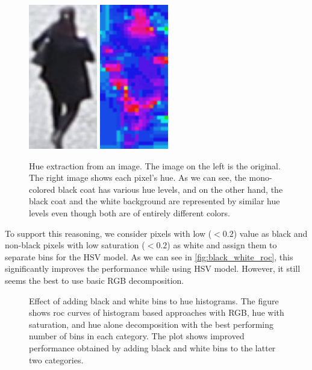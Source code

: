 \begin{figure}
    \centering
    \includegraphics[width=3cm]{img/bad_hue_orig.png}
    \includegraphics[width=3cm]{img/bad_hue_hue.png}
    \caption[Hue extraction from an image]{Hue extraction from an image. The image on the left is the original. The right image shows each pixel's hue. As we can see, the mono-colored black coat has various hue levels, and on the other hand, the black coat and the white background are represented by similar hue levels even though both are of entirely different colors.}
    \label{fig:bad_hue}
\end{figure}

To support this reasoning, we consider pixels with low ($< 0.2$)
value as black and non-black pixels with low saturation ($< 0.2$) as white and
assign them to separate bins for the HSV model. As we can see in \autoref{fig:black_white_roc}, this
significantly improves the performance while using HSV model. However, it still seems the best to use basic RGB decomposition.

\begin{figure}
    \def\svgwidth{0.9\columnwidth}
    
    \caption[Effect of adding black and white bins to the hue histograms]{Effect of adding black and white bins to hue histograms. The figure shows \gls{roc} curves of histogram based approaches with RGB, hue with saturation, and hue alone decomposition with the best performing number of bins in each category. The plot shows improved performance obtained by adding black and white bins to the latter two categories.}
    \label{fig:black_white_roc}
\end{figure}


